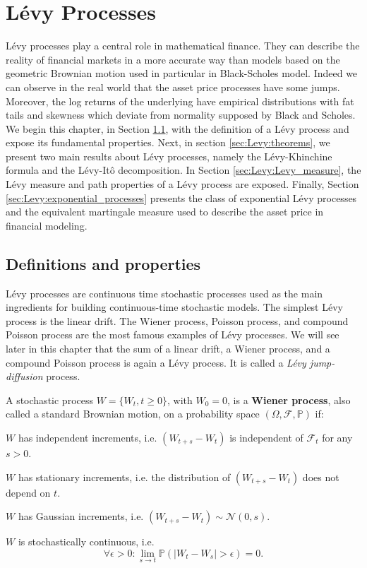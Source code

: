 \chapter{L\'evy Processes}
\label{sec:Levy}


L\'evy processes play a central role in mathematical finance. They can describe the reality of financial markets in a more accurate way than models based on the geometric Brownian motion used in particular in Black-Scholes model. Indeed we can observe in the real world that the asset price processes have some jumps. Moreover, the log returns of the underlying have empirical distributions with fat tails and skewness which deviate from normality supposed by Black and Scholes. We begin this chapter, in Section \ref{sec:Levy:definitions}, with the definition of a L\'evy process and expose its fundamental properties. Next, in section \ref{sec:Levy:theorems}, we present two main results about L\'evy processes, namely the L\'evy-Khinchine formula and the L\'evy-Itô decomposition. In Section \ref{sec:Levy:Levy_measure}, the L\'evy measure and  path properties of a L\'evy process are exposed. Finally, Section \ref{sec:Levy:exponential_processes} presents the class of exponential L\'evy processes and the equivalent martingale measure used to describe the asset price in financial modeling.

\section{Definitions and properties}
\label{sec:Levy:definitions}
L\'evy processes are continuous time stochastic processes used as the main ingredients for building continuous-time stochastic models. The simplest L\'evy process is the linear drift. The Wiener process, Poisson process, and compound Poisson process are the most famous examples of L\'evy processes. We will see later in this chapter that the sum of a linear drift, a Wiener process, and a compound Poisson process is again a L\'evy process. It is called a \textit{L\'evy jump-diffusion} process.

\begin{defn}\label{def:wiener}
A stochastic process $W = \{W_t,t\geq 0\}$, with $W_0=0$, is a \textbf{Wiener process}, also called a standard Brownian motion, on a probability space $(\Omega,\mathcal{F},\mathbb{P})$ if:
\begin{my_list_num}
\item $W$ has independent increments, i.e. $(W_{t+s}-W_t)$ is independent of $\mathcal{F}_t$ for any $s>0$.
\item $W$ has stationary increments, i.e. the distribution of $(W_{t+s}-W_t)$ does not depend on $t$.
\item $W$ has Gaussian increments, i.e. $(W_{t+s}-W_t) \sim \mathcal{N}(0,s)$.
\item $W$ is stochastically continuous, i.e. $$\forall \epsilon>0: \lim_{s \to t}\mathbb{P}(|W_t-W_s|>\epsilon)=0.$$
\end{my_list_num}
\end{defn}


